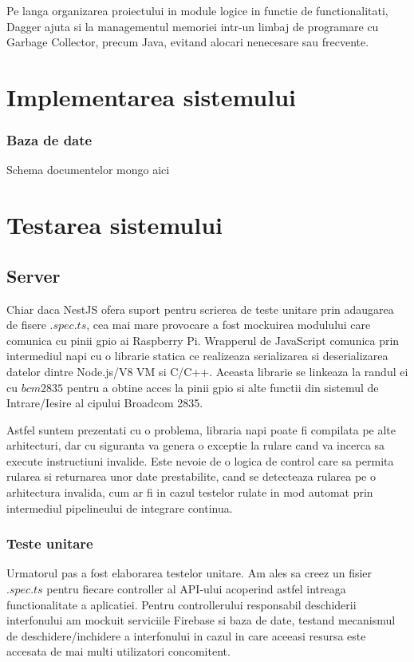 Pe langa organizarea proiectului in module logice in functie de functionalitati, Dagger ajuta si la managementul memoriei intr-un limbaj de programare cu Garbage Collector, precum Java, evitand alocari nenecesare sau frecvente.


\section {Implementarea sistemului}

\subsubsection {Baza de date}

Schema documentelor mongo aici

\section {Testarea sistemului}

\subsection {Server}

Chiar daca NestJS ofera suport pentru scrierea de teste unitare prin adaugarea de fisere $.spec.ts$, cea mai mare provocare a fost mockuirea modulului care comunica cu pinii \acrshort{gpio} ai Raspberry Pi. Wrapperul de JavaScript comunica prin intermediul \acrfull{napi} cu o librarie statica ce realizeaza serializarea si deserializarea datelor dintre Node.js/V8 VM si C/C++. Aceasta librarie se linkeaza la randul ei cu $bcm2835$ pentru a obtine acces la pinii \acrshort{gpio} si alte functii din sistemul de Intrare/Iesire al cipului Broadcom 2835.

Astfel suntem prezentati cu o problema, libraria \acrshort{napi} poate fi compilata pe alte arhitecturi, dar cu siguranta va genera o exceptie la rulare cand va incerca sa execute instructiuni invalide. Este nevoie de o logica de control care sa permita rularea si returnarea unor date prestabilite, cand se detecteaza rularea pe o arhitectura invalida, cum ar fi in cazul testelor rulate in mod automat prin intermediul pipelineului de integrare continua.

\subsubsection {Teste unitare}

Urmatorul pas a fost elaborarea testelor unitare. Am ales sa creez un fisier $.spec.ts$ pentru fiecare controller al API-ului acoperind astfel intreaga functionalitate a aplicatiei. Pentru controllerului responsabil deschiderii interfonului am mockuit serviciile Firebase si baza de date, testand mecanismul de deschidere/inchidere a interfonului in cazul in care aceeasi resursa este accesata de mai multi utilizatori concomitent.

